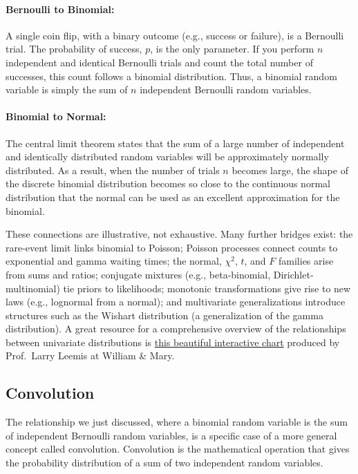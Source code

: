 \paragraph*{Bernoulli to Binomial:} A single coin flip, with a binary outcome (e.g., success or failure), is a Bernoulli trial. The probability of success, $p$, is the only parameter. If you perform $n$ independent and identical Bernoulli trials and count the total number of successes, this count follows a binomial distribution. Thus, a binomial random variable is simply the sum of $n$ independent Bernoulli random variables.
    
\paragraph*{Binomial to Normal:} The central limit theorem states that the sum of a large number of independent and identically distributed random variables will be approximately normally distributed. As a result, when the number of trials $n$ becomes large, the shape of the discrete binomial distribution becomes so close to the continuous normal distribution that the normal can be used as an excellent approximation for the binomial.

These connections are illustrative, not exhaustive. Many further bridges exist: the rare-event limit links binomial to Poisson; Poisson processes connect counts to exponential and gamma waiting times; the normal, $\chi^2$, $t$, and $F$ families arise from sums and ratios; conjugate mixtures (e.g., beta-binomial, Dirichlet-multinomial) tie priors to likelihoods; monotonic transformations give rise to new laws (e.g., lognormal from a normal); and multivariate generalizations introduce structures such as the Wishart distribution (a generalization of the gamma distribution). A great resource for a comprehensive overview of the relationships between univariate distributions is \href{https://www.math.wm.edu/~leemis/chart/UDR/UDR.html}{this beautiful interactive chart} produced by Prof.\ Larry Leemis at William \& Mary.

\subsection{Convolution}
The relationship we just discussed, where a binomial random variable is the sum of independent Bernoulli random variables, is a specific case of a more general concept called convolution. Convolution is the mathematical operation that gives the probability distribution of a sum of two independent random variables.

